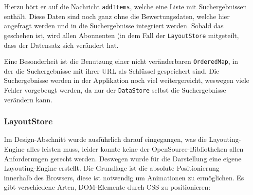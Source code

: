 \documentclass[12pt,twoside]{book}
\begin{document}
Hierzu hört er auf die Nachricht \texttt{addItems}, welche eine Liste mit Suchergebnissen enthält. Diese Daten sind noch ganz ohne die Bewertungsdaten, welche hier angefragt werden und in die Suchergebnisse integriert werden. Sobald das geschehen ist, wird allen Abonnenten (in dem Fall der \texttt{LayoutStore} mitgeteilt, dass der Datensatz sich verändert hat.

Eine Besonderheit ist die Benutzung einer nicht veränderbaren \texttt{OrderedMap}, in der die Suchergebnisse mit ihrer URL als Schlüssel gespeichert sind. Die Suchergebnisse werden in der Applikation noch viel weitergereicht, weswegen viele Fehler vorgebeugt werden, da nur der \texttt{DataStore} selbst die Suchergebnisse verändern kann.

\subsubsection*{LayoutStore}

Im Design-Abschnitt wurde ausführlich darauf eingegangen, was die Layouting-Engine alles leisten muss, leider konnte keine der OpenSource-Bibliotheken allen Anforderungen gerecht werden. Deswegen wurde für die Darstellung eine eigene Layouting-Engine erstellt.
Die Grundlage ist die absolute Positionierung innerhalb des Browsers, diese ist notwendig um Animationen zu ermöglichen. Es gibt verschiedene Arten, DOM-Elemente durch CSS zu positionieren:
\end{document}
